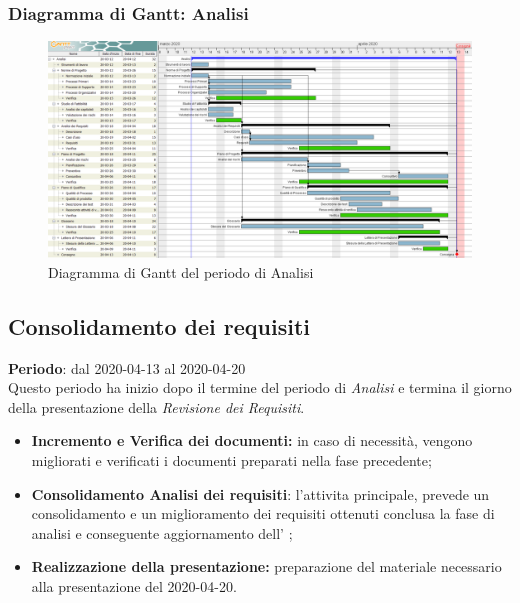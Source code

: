 	\subsubsection{Diagramma di Gantt: Analisi}
		\begin{figure}[h]
			\centering
			\includegraphics[width=1.1\textwidth]{./res/img/DiagrammiGantt/analisi_gantt.png}
			\caption{Diagramma di Gantt del periodo di Analisi}
		\end{figure}

\subsection{Consolidamento dei requisiti}
\textbf{Periodo}: dal 2020-04-13 al 2020-04-20 \\
Questo periodo ha inizio dopo il termine del periodo di \textit{Analisi} e termina il giorno della presentazione della \textit{Revisione dei Requisiti}. \\
\begin{itemize}
	\item \textbf{Incremento e Verifica dei documenti:} in caso di necessità, vengono migliorati e verificati i documenti preparati nella fase precedente;
	\item \textbf{Consolidamento Analisi dei requisiti}: l'attivita principale, prevede un consolidamento e un miglioramento dei requisiti ottenuti conclusa la fase di analisi e conseguente aggiornamento dell' \AdR{};
	\item \textbf{Realizzazione della presentazione:} preparazione del materiale necessario alla presentazione del 2020-04-20.
\end{itemize}
